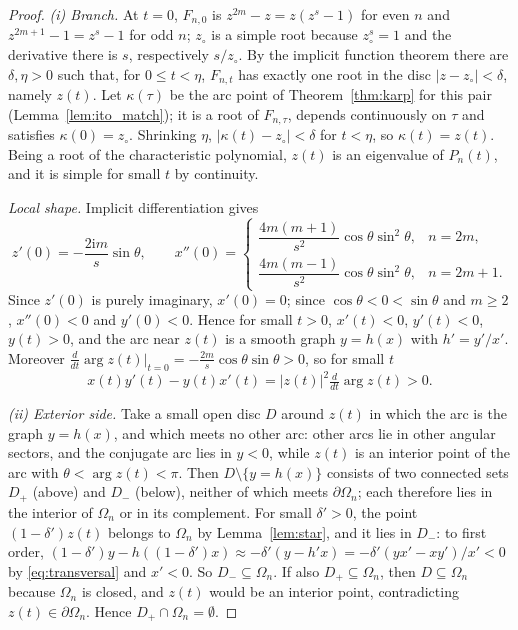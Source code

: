 \documentclass[11pt,a4paper]{article}
\numberwithin{equation}{section}
\theoremstyle{definition}
\theoremstyle{remark}
\newcommand{\ii}{\mathrm{i}}
\newcommand{\Om}{\Omega}
\begin{document}
\begin{proof}
\emph{(i) Branch.} At \(t=0\), \(F_{n,0}\) is \(z^{2m}-z=z(z^{s}-1)\)
for even \(n\) and \(z^{2m+1}-1=z^s-1\) for odd \(n\); \(z_\circ\) is a
simple root because \(z_\circ^s=1\) and the derivative there is \(s\),
respectively \(s/z_\circ\). By the implicit function theorem there are
\(\delta,\eta>0\) such that, for \(0\le t<\eta\), \(F_{n,t}\) has exactly
one root in the disc \(|z-z_\circ|<\delta\), namely \(z(t)\). Let
\(\kappa(\tau)\) be the arc point of Theorem~\ref{thm:karp} for this
pair (Lemma~\ref{lem:ito_match}); it is a root of \(F_{n,\tau}\),
depends continuously on \(\tau\) and satisfies \(\kappa(0)=z_\circ\).
Shrinking \(\eta\), \(|\kappa(t)-z_\circ|<\delta\) for \(t<\eta\), so
\(\kappa(t)=z(t)\). Being a root of the characteristic polynomial,
\(z(t)\) is an eigenvalue of \(P_n(t)\), and it is simple for small
\(t\) by continuity.

\emph{Local shape.} Implicit differentiation gives
\begin{equation}
z'(0)=-\frac{2\ii m}{s}\sin\theta,
\qquad
x''(0)=
\begin{cases}
\dfrac{4m(m+1)}{s^2}\cos\theta\sin^2\theta,&n=2m,\\[0.6em]
\dfrac{4m(m-1)}{s^2}\cos\theta\sin^2\theta,&n=2m+1.
\end{cases}
\label{eq:general_derivatives}
\end{equation}
Since \(z'(0)\) is purely imaginary, \(x'(0)=0\); since
\(\cos\theta<0<\sin\theta\) and \(m\ge2\), \(x''(0)<0\) and
\(y'(0)<0\). Hence for small \(t>0\), \(x'(t)<0\), \(y'(t)<0\),
\(y(t)>0\), and the arc near \(z(t)\) is a smooth graph \(y=h(x)\) with
\(h'=y'/x'\). Moreover
\(\frac{d}{dt}\arg z(t)|_{t=0}=-\frac{2m}{s}\cos\theta\sin\theta>0\),
so for small \(t\)
\begin{equation}
x(t)y'(t)-y(t)x'(t)=|z(t)|^2\tfrac{d}{dt}\arg z(t)>0.
\label{eq:transversal}
\end{equation}

\emph{(ii) Exterior side.} Take a small open disc \(D\) around \(z(t)\)
in which the arc is the graph \(y=h(x)\), and which meets no other
arc: other arcs lie in other angular sectors, and the conjugate arc
lies in \(y<0\), while \(z(t)\) is an interior point of the arc with
\(\theta<\arg z(t)<\pi\). Then \(D\setminus\{y=h(x)\}\) consists of two
connected sets \(D_+\) (above) and \(D_-\) (below), neither of which
meets \(\partial\Om_n\); each therefore lies in the interior of
\(\Om_n\) or in its complement. For small \(\delta'>0\), the point
\((1-\delta')z(t)\) belongs to \(\Om_n\) by Lemma~\ref{lem:star}, and
it lies in \(D_-\): to first order,
\((1-\delta')y-h((1-\delta')x)\approx-\delta'(y-h'x)
=-\delta'(yx'-xy')/x'<0\) by \eqref{eq:transversal} and \(x'<0\). So
\(D_-\subseteq\Om_n\). If also \(D_+\subseteq\Om_n\), then
\(D\subseteq\Om_n\) because \(\Om_n\) is closed, and \(z(t)\) would be
an interior point, contradicting \(z(t)\in\partial\Om_n\). Hence
\(D_+\cap\Om_n=\emptyset\).
\end{proof}
\end{document}
